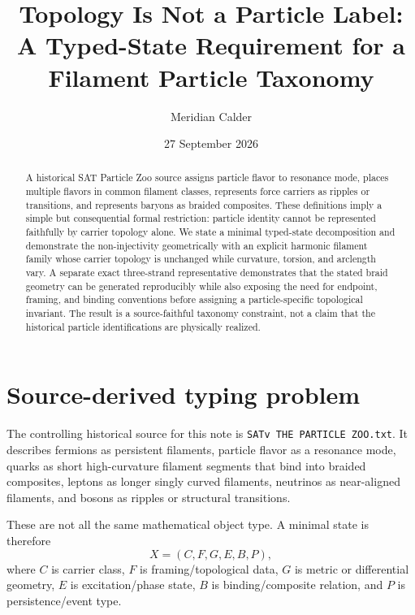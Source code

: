 \documentclass[aps,prd,reprint,floatfix,nofootinbib]{revtex4-2}
\begin{document}
\title{Topology Is Not a Particle Label: A Typed-State Requirement for a Filament Particle Taxonomy}
\author{Meridian Calder}
\date{27 September 2026}

\begin{abstract}
A historical SAT Particle Zoo source assigns particle flavor to resonance mode,
places multiple flavors in common filament classes, represents force carriers
as ripples or transitions, and represents baryons as braided composites.
These definitions imply a simple but consequential formal restriction:
particle identity cannot be represented faithfully by carrier topology alone.
We state a minimal typed-state decomposition and demonstrate the
non-injectivity geometrically with an explicit harmonic filament family whose
carrier topology is unchanged while curvature, torsion, and arclength vary.
A separate exact three-strand representative demonstrates that the stated
braid geometry can be generated reproducibly while also exposing the need for
endpoint, framing, and binding conventions before assigning a particle-specific
topological invariant.  The result is a source-faithful taxonomy constraint,
not a claim that the historical particle identifications are physically realized.
\end{abstract}

\maketitle

\section{Source-derived typing problem}

The controlling historical source for this note is
\texttt{SATv THE PARTICLE ZOO.txt}.
It describes fermions as persistent filaments, particle flavor as a resonance
mode, quarks as short high-curvature filament segments that bind into braided
composites, leptons as longer singly curved filaments, neutrinos as near-aligned
filaments, and bosons as ripples or structural transitions.

These are not all the same mathematical object type.  A minimal state is
therefore
\begin{equation}
X=(C,F,G,E,B,P),
\end{equation}
where $C$ is carrier class, $F$ is framing/topological data, $G$ is metric or
differential geometry, $E$ is excitation/phase state, $B$ is binding/composite
relation, and $P$ is persistence/event type.
\end{document}
